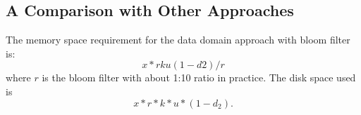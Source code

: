 



\subsection{A Comparison with Other Approaches}

The memory  space requirement for the data domain approach with bloom filter is:
\[
x*r k u (1-d2)/r
\]
where $r$ is the bloom filter with about  1:10 ratio in practice.  The disk space used  is 
\[
x*r *k *u*(1-d_2).
\]



